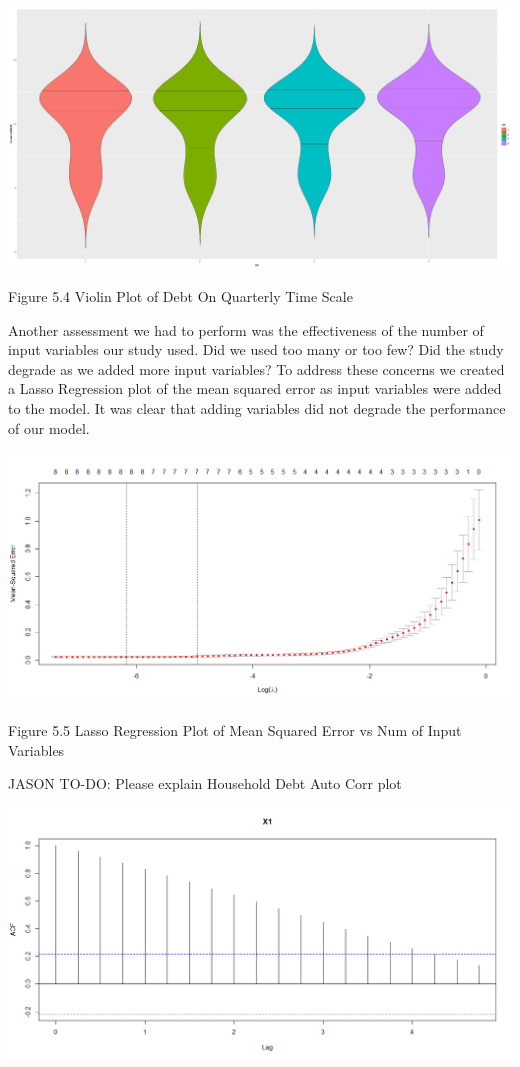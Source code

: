 \documentclass[sigconf,nonacm,11pt]{acmart}
\begin{document}
 
\vspace{0.5em}
\includegraphics[scale = 0.13]{QtrVSHouseholdDebt_violinPlot.png}

Figure 5.4 Violin Plot of Debt On Quarterly Time Scale
\vspace{0.75em}

Another assessment we had to perform was the effectiveness of the number of input variables our study used. Did we used too many or too few?  Did the study degrade as we added more input variables?  To address these concerns we created a Lasso Regression plot of the mean squared error as input variables were added to the model. It was clear that adding variables did not degrade the performance of our model.


\vspace{0.5em}
\includegraphics[scale = 0.18]{LASSORegression_Plot.png}

Figure 5.5 Lasso Regression Plot of Mean Squared Error vs Num of Input Variables
\vspace{0.75em}

JASON TO-DO: Please explain Household Debt Auto Corr plot

\vspace{0.5em}
\includegraphics[scale = 0.18]{HouseholdDebtAutoCor.png}
\end{document}
